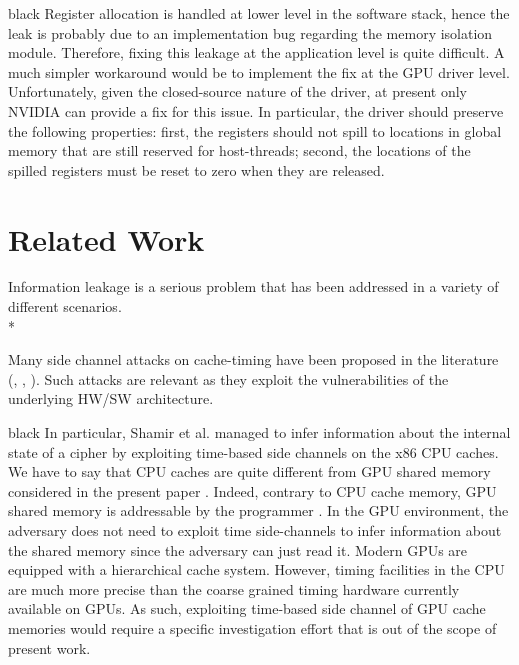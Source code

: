 \documentclass[11pt,onecolumn,letterpaper]{IEEEtran}
\newcommand{\clr}{black}
\begin{document}
\begin{color}{\clr}
Register allocation is handled at lower level in the software stack, 
hence the leak is probably due to an implementation bug regarding the memory isolation module.
Therefore, fixing this leakage at the application level is quite difficult.
A much simpler workaround would be to implement the fix at the GPU driver level.
Unfortunately, given the closed-source nature of the driver, at present only NVIDIA can provide a fix for this issue.
In particular, the driver should preserve the following properties: 
first, the registers should not spill to locations in global memory that are still reserved for host-threads;
second, the locations of the spilled registers must be reset to zero when they are released.
\end{color}

\section{Related Work}
\label{related}
Information leakage is a serious problem that has been addressed in a variety of different scenarios.\\*

Many side channel attacks on cache-timing have been proposed in the literature (\cite{shamir-aes}, \cite{des-sidechan},
\cite{Menichelli:2008:HSA:1439183.1439192}).
Such attacks are relevant as they exploit the vulnerabilities of the underlying HW/SW architecture.
\begin{color}{\clr}
\label{cpuleakage} 
In particular, Shamir et al. \cite{shamir-aes} managed to infer information about the internal state of a cipher by 
exploiting time-based side channels on the x86 CPU caches.
We have to say that CPU caches are quite different from GPU shared memory considered in the present paper \cite{Cope:2010:PCG:1749402.1749493}. 
Indeed, contrary to CPU cache memory, GPU shared memory is addressable by the programmer \cite{Xu:2012:OSM:2376362.2376726}. 
In the GPU environment, the adversary does not need to exploit time side-channels to infer information about the shared memory since the adversary can just read it. 
Modern GPUs are equipped with a hierarchical cache system.
However, timing facilities in the CPU are much more precise than the coarse grained timing hardware currently available on GPUs.
As such, exploiting time-based side channel of GPU cache memories would require a specific investigation effort that is out of the scope of present work.
\end{color}
\end{document}
